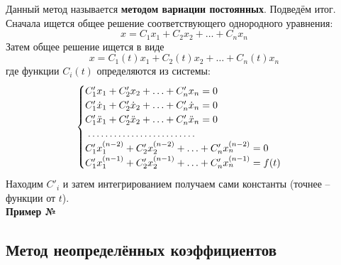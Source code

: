 \documentclass[a4paper,12pt]{article}
\newcommand{\dotffill}[1]{\parbox[t]{#1}{\dotfill}}
\newcommand{\dx}{\dot{x}}
\newcommand{\ddx}{\ddot{x}}
\begin{document}
Данный метод называется \textbf{методом вариации постоянных}. Подведём итог. Сначала ищется общее решение соответствующего однородного уравнения:
\[x = C_1x_1 + C_2x_2 + \ldots + C_nx_n\]
Затем общее решение ищется в виде 
\[x = C_1(t)x_1 + C_2(t)x_2 + \ldots + C_n(t)x_n\] где функции $C_i(t)$ определяются из системы:
\[\begin{cases}
C'_1x_1 + C'_2x_2 + \ldots + C'_nx_n = 0\\
C'_1\dx_1 + C'_2\dx_2 + \ldots + C'_n\dx_n = 0\\
C'_1\ddx_1 + C'_2\ddx_2 + \ldots + C'_n \ddx_n = 0\\
\dotffill{0.33\textwidth}\\
C'_1x_1^{(n - 2)} + C'_2x_2^{(n - 2)} + \ldots + C'_nx_n^{(n - 2)} = 0\\
C'_1x_1^{(n - 1)} + C'_2x_2^{(n - 1)} + \ldots + C'_nx_n^{(n - 1)} = f(t)
\end{cases}\]
Находим $C'_i$ и затем интегрированием получаем сами константы (точнее -- функции от $t$).
\ \\

\textbf{Пример №}

\subsection{Метод неопределённых коэффициентов}
\end{document}
